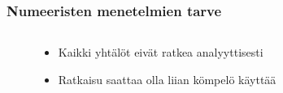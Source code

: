 \documentclass[finnish, 11pt, fleqn]{beamer}
\begin{document}
\begin{frame}
    \frametitle{Numeeristen menetelmien tarve}

		

		\begin{columns}[onlytextwidth]
		\begin{column}{.45\textwidth}
			\begin{figure}
    			\begin{itemize}
    				\vspace{-4em}
    				\item{Kaikki yhtälöt eivät ratkea analyyttisesti}
    				\vspace{1em}
    				\item{Ratkaisu saattaa olla liian kömpelö käyttää}
    			\end{itemize}
			\end{figure}
		\end{column}
		\hfill
		\begin{column}{.55\textwidth}
			\begin{figure}[h!]

\end{figure}
\end{column}
\end{columns}
\end{frame}
\end{document}
